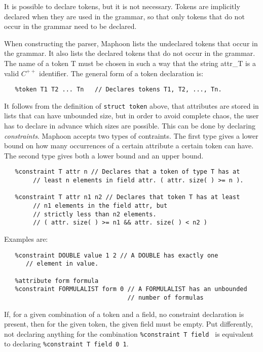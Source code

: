 \documentclass{article}
\begin{document}
\noindent
It is possible to declare tokens, but it is not necessary.
Tokens are implicitly declared when they are used in the grammar,
so that only tokens that do not occur in the grammar need to be declared.

When constructing the parser,
Maphoon lists the undeclared tokens that occur in the grammar. It 
also lists the declared tokens that do not occur in the grammar. 
The name of a token T must be chosen in such a way that the string 
attr\_T is a valid 
$ C^{++} $ identifier. 
The general form of a token declaration is:

\begin{verbatim}
   %token T1 T2 ... Tn   // Declares tokens T1, T2, ..., Tn. 
\end{verbatim}

\noindent
It follows from the definition of \verb+struct token+ above, that 
attributes are stored in lists that can have unbounded size,
but in order to avoid 
complete chaos, the user has to declare in advance which sizes
are possible. This can be done by declaring \emph{constraints}. 
Maphoon accepts two types of contraints. The first type gives 
a lower bound on how many occurrences of a certain attribute a 
certain token can have. The second type gives both a lower bound
and an upper bound. 

\begin{verbatim}
   %constraint T attr n // Declares that a token of type T has at 
        // least n elements in field attr. ( attr. size( ) >= n ).

   %constraint T attr n1 n2 // Declares that token T has at least 
        // n1 elements in the field attr, but 
        // strictly less than n2 elements.  
        // ( attr. size( ) >= n1 && attr. size( ) < n2 )
\end{verbatim}
Examples are:
\begin{verbatim}
   %constraint DOUBLE value 1 2 // A DOUBLE has exactly one 
      // element in value.

   %attribute form formula 
   %constraint FORMULALIST form 0 // A FORMULALIST has an unbounded 
                                  // number of formulas 
\end{verbatim}

\noindent
If, for a given combination of a token and a field, no constraint
declaration is present, then for the given token, the given
field must be empty.
Put differently, not declaring 
anything for the
combination \verb+%constraint T field + is equivalent to declaring
\verb+%constraint T field 0 1+.
\end{document}
